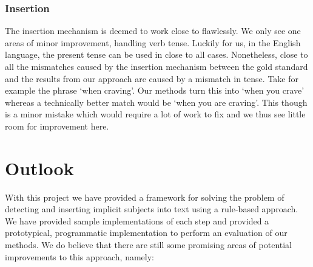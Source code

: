 \documentclass[times, 10pt,twocolumn]{article}
\begin{document}




\subsubsection{Insertion}
The insertion mechanism is deemed to work close to flawlessly. We only see one
areas of minor improvement, handling verb tense. Luckily for us, in the English
language, the present tense can be used in close to all cases. Nonetheless,
close to all the mismatches caused by the insertion mechanism
between the gold standard and the results from our approach are caused by
a mismatch in tense. Take for example the phrase `when craving'. Our methods
turn this into `when you crave' whereas a technically better match would
be `when you are craving'. This though is a minor mistake which would require
a lot of work to fix and we thus see little room for improvement here.







\section{Outlook}
With this project we have provided a framework for solving the problem of detecting
and inserting implicit subjects into text using a rule-based approach. We have provided
sample implementations of each step and provided a prototypical, programmatic implementation
to perform an evaluation of our methods. We do believe that there are still some promising
areas of potential improvements to this approach, namely:
\end{document}
